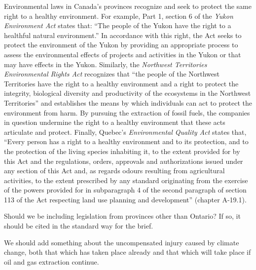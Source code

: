 Environmental laws in Canada's provinces recognize and seek to protect the same right to a healthy environment.  
For example, Part 1, section 6 of the \emph{Yukon Environment Act} states that: ``The people of the Yukon have the right to a healthful natural environment.''   
In accordance with this right, the Act seeks to protect the environment of the Yukon by providing an appropriate process to assess the environmental effects of projects and activities in the Yukon or that may have effects in the Yukon. 
Similarly, the \emph{Northwest Territories Environmental Rights Act} recognizes that ``the people of the Northwest Territories have the right to a healthy environment and a right to protect the integrity, biological diversity and productivity of the ecosystems in the Northwest Territories'' and establishes the means by which individuals can act to protect the environment from harm. 
By pursuing the extraction of fossil fuels, the companies in question undermine the right to a healthy environment that these acts articulate and protect. 
Finally, Quebec’s \emph{Environmental Quality Act} states that, ``Every person has a right to a healthy environment and to its protection, and to the protection of the living species inhabiting it, to the extent provided for by this Act and the regulations, orders, approvals and authorizations issued under any section of this Act and, as regards odours resulting from agricultural activities, to the extent prescribed by any standard originating from the exercise of the powers provided for in subparagraph 4 of the second paragraph of section 113 of the Act respecting land use planning and development'' (chapter A-19.1).  



\begin{vcom}
Should we be including legislation from provinces other than Ontario? If so, it should be cited in the standard way for the brief.
\end{vcom}


\begin{vcom}
We should add something about the uncompensated injury caused by climate change, both that which has taken place already and that which will take place if oil and gas extraction continue.
\end{vcom}


